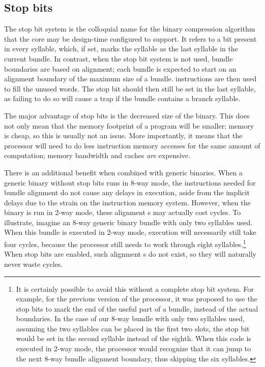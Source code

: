 
\subsection{Stop bits}
\label{sec:core-ug-isa-sbit}

The stop bit system is the colloquial name for the binary compression algorithm
that the core may be design-time configured to support. It refers to a bit
present in every syllable, which, if set, marks the syllable as the last syllable
in the current bundle. In contrast, when the stop bit system is not used, bundle
boundaries are based on alignment; each bundle is expected to start on an
alignment boundary of the maximum size of a bundle.  instructions are
then used to fill the unused words. The stop bit should then still be set in the
last syllable, as failing to do so will cause a trap if the bundle contains a
branch syllable.

The major advantage of stop bits is the decreased size of the binary. This does
not only mean that the memory footprint of a program will be smaller; memory is
cheap, so this is usually not an issue. More importantly, it means that the
processor will need to do less instruction memory accesses for the same amount
of computation; memory bandwidth and caches \emph{are} expensive.

There is an additional benefit when combined with generic binaries. When a
generic binary without stop bits runs in 8-way mode, the  instructions
needed for bundle alignment do not cause any delays in execution, aside from the
implicit delays due to the strain on the instruction memory system. However,
when the binary is run in 2-way mode, these alignment s may actually
cost cycles. To illustrate, imagine an 8-way generic binary bundle with only
two syllables used. When this bundle is executed in 2-way mode, execution will
necessarily still take four cycles, because the processor still needs to work
through eight syllables.\footnote{It is certainly possible to avoid this without
a complete stop bit system. For example, for the previous version of the \rvex{}
processor, it was proposed to use the stop bits to mark the end of the useful
part of a bundle, instead of the actual boundaries. In the case of our 8-way
bundle with only two syllables used, assuming the two syllables can be placed
in the first two slots, the stop bit would be set in the second syllable instead
of the eighth. When this code is executed in 2-way mode, the \rvex{} processor
would recognize that it can jump to the next 8-way bundle alignment boundary,
thus skipping the six  syllables.} When stop bits are enabled, such
alignment s do not exist, so they will naturally never waste cycles.

